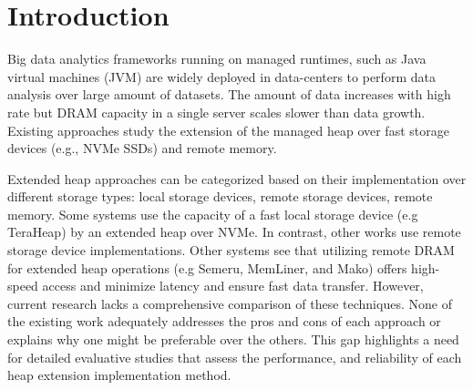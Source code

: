\section{Introduction}
Big data analytics frameworks running on managed runtimes, such as Java virtual
machines (JVM) are widely deployed in data-centers to perform data analysis over
large amount of datasets. The amount of data increases with high rate but DRAM
capacity in a single server scales slower than data growth. Existing approaches
study the extension of the managed heap over fast storage devices (e.g., NVMe
SSDs) and remote memory.

\par Extended heap approaches can be categorized based on their implementation over
different storage types: local storage devices, remote storage devices, remote memory. Some systems use the capacity of a fast local storage device (e.g TeraHeap) by an extended heap over NVMe. In contrast, other works use remote storage device
implementations. Other systems see that utilizing remote DRAM for
extended heap operations (e.g Semeru, MemLiner, and Mako) offers high-speed
access and minimize latency and ensure fast data transfer. However, current research lacks a comprehensive comparison of these
techniques. None of the existing work adequately addresses the pros and cons of
each approach or explains why one might be preferable over the others. This gap
highlights a need for detailed evaluative studies that assess the performance,
and reliability of each heap extension implementation
method.




